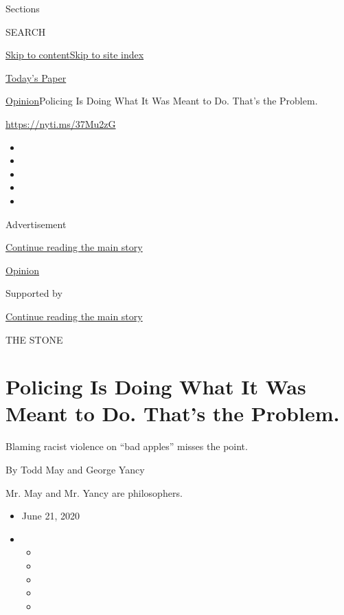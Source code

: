 Sections

SEARCH

\protect\hyperlink{site-content}{Skip to
content}\protect\hyperlink{site-index}{Skip to site index}

\href{https://myaccount.nytimes.com/auth/login?response_type=cookie\&client_id=vi}{}

\href{https://www.nytimes.com/section/todayspaper}{Today's Paper}

\href{/section/opinion}{Opinion}\textbar{}Policing Is Doing What It Was
Meant to Do. That's the Problem.

\href{https://nyti.ms/37Mu2zG}{https://nyti.ms/37Mu2zG}

\begin{itemize}
\item
\item
\item
\item
\item
\end{itemize}

Advertisement

\protect\hyperlink{after-top}{Continue reading the main story}

\href{/section/opinion}{Opinion}

Supported by

\protect\hyperlink{after-sponsor}{Continue reading the main story}

THE STONE

\hypertarget{policing-is-doing-what-it-was-meant-to-do-thats-the-problem}{%
\section{Policing Is Doing What It Was Meant to Do. That's the
Problem.}\label{policing-is-doing-what-it-was-meant-to-do-thats-the-problem}}

Blaming racist violence on ``bad apples'' misses the point.

By Todd May and George Yancy

Mr. May and Mr. Yancy are philosophers.

\begin{itemize}
\item
  June 21, 2020
\item
  \begin{itemize}
  \item
  \item
  \item
  \item
  \item
  \end{itemize}
\end{itemize}


